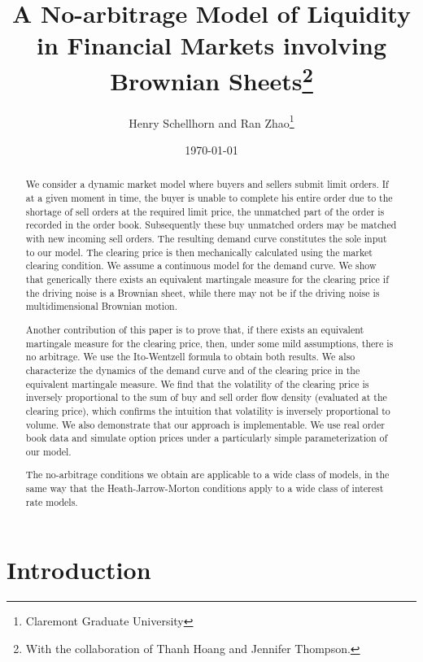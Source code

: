 \documentclass{article}
\begin{document}
\title{A No-arbitrage Model of Liquidity in Financial Markets involving
Brownian Sheets\thanks{%
With the collaboration of Thanh Hoang and Jennifer Thompson.}}
\author{Henry Schellhorn and Ran Zhao\thanks{%
Claremont Graduate University}}
\date{\today }
\maketitle

\begin{abstract}
We consider a dynamic market model where buyers and sellers submit limit
orders. If at a given moment in time, the buyer is unable to complete his
entire order due to the shortage of sell orders at the required limit price,
the unmatched part of the order is recorded in the order book. Subsequently
these buy unmatched orders may be matched with new incoming sell orders. The
resulting demand curve constitutes the sole input to our model. The clearing
price is then mechanically calculated using the market clearing condition.
We assume a continuous model for the demand curve. We show that generically
there exists an equivalent martingale measure for the clearing price if the
driving noise is a Brownian sheet, while there may not be if the driving
noise is multidimensional Brownian motion.

Another contribution of this paper is to prove that, if there exists an
equivalent martingale measure for the clearing price, then, under some mild
assumptions, there is no arbitrage. We use the Ito-Wentzell formula to
obtain both results. We also characterize the dynamics of the demand curve
and of the clearing price in the equivalent martingale measure. We find that
the volatility of the clearing price is inversely proportional to the sum of
buy and sell order flow density (evaluated at the clearing price), which
confirms the intuition that volatility is inversely proportional to volume.
We also demonstrate that our approach is implementable. We use real order
book data and simulate option prices under a particularly simple
parameterization of our model.

The no-arbitrage conditions we obtain are applicable to a wide class of
models, in the same way that the Heath-Jarrow-Morton conditions apply to a
wide class of interest rate models.
\end{abstract}

\section{Introduction}
\end{document}
